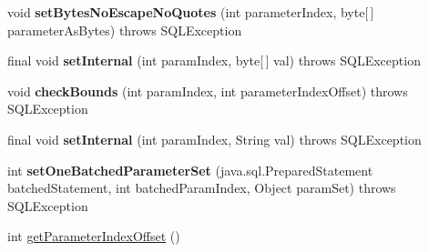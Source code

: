 \begin{DoxyCompactItemize}
\item 
\mbox{\label{classcom_1_1mysql_1_1jdbc_1_1_prepared_statement_ac81fd3136eaf9d9413981580ea24d675}} 
void {\bfseries set\+Bytes\+No\+Escape\+No\+Quotes} (int parameter\+Index, byte\mbox{[}$\,$\mbox{]} parameter\+As\+Bytes)  throws S\+Q\+L\+Exception 
\item 
\mbox{\label{classcom_1_1mysql_1_1jdbc_1_1_prepared_statement_abe4f7422dafc47e6e0862ad6f5f23ac8}} 
final void {\bfseries set\+Internal} (int param\+Index, byte\mbox{[}$\,$\mbox{]} val)  throws S\+Q\+L\+Exception 
\item 
\mbox{\label{classcom_1_1mysql_1_1jdbc_1_1_prepared_statement_a1b0d85e127268e978746a2fca6797d7c}} 
void {\bfseries check\+Bounds} (int param\+Index, int parameter\+Index\+Offset)  throws S\+Q\+L\+Exception 
\item 
\mbox{\label{classcom_1_1mysql_1_1jdbc_1_1_prepared_statement_a54f321a6a054f27cc4c123e6ec9892ce}} 
final void {\bfseries set\+Internal} (int param\+Index, String val)  throws S\+Q\+L\+Exception 
\item 
\mbox{\label{classcom_1_1mysql_1_1jdbc_1_1_prepared_statement_aa058984dec1f45b04300f03f9e983bd5}} 
int {\bfseries set\+One\+Batched\+Parameter\+Set} (java.\+sql.\+Prepared\+Statement batched\+Statement, int batched\+Param\+Index, Object param\+Set)  throws S\+Q\+L\+Exception 
\item 
int \mbox{\hyperlink{classcom_1_1mysql_1_1jdbc_1_1_prepared_statement_a80a81c39177a5e46c653efb1acd9e797}{get\+Parameter\+Index\+Offset}} ()
\end{DoxyCompactItemize}
